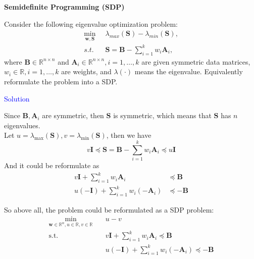 \item[\uppercase\expandafter{\romannumeral3}.]\textbf{Semidefinite Programming (SDP)}

Consider the following eigenvalue optimization problem:
$$
\begin{aligned}
\min_{\mathbf{w}, \mathbf{S}}\;\; &\lambda_{max}(\mathbf{S})-\lambda_{min}(\mathbf{S}),\\
s.t.\;\;& \mathbf{S}=\mathbf{B}-\sum_{i=1}^{k}w_i\mathbf{A}_i,
\end{aligned}
$$
where $\mathbf{B}\in \mathbb R^{n\times n}$ and $\mathbf{A}_i\in \mathbb R^{n\times n}, i=1, \dots, k$ are given symmetric data matrices, $w_i\in\mathbb{R}, i=1, \dots, k$ are weights, and $\lambda(\cdot)$ means the eigenvalue. Equivalently reformulate the problem into a SDP. 

\textcolor{blue}{Solution}

Since $\pmb B, \pmb A_i$ are symmetric, then $\pmb S$ is symmetric, which means that $\pmb S$ has $n$ eigenvalues. \\
Let $u=\lambda_{\max}(\pmb S), v=\lambda_{\min}(\pmb S)$, then we have
$$ v\pmb I \preceq \pmb S =\mathbf{B}-\sum_{i=1}^{k}w_i\mathbf{A}_i \preceq u\pmb I$$
And it could be reformulate as
\begin{align*}
v\pmb I + \sum_{i=1}^k w_i\pmb A_i &\preceq \pmb B \\
u(-\pmb I) + \sum_{i=1}^k w_i (-\pmb A_i) &\preceq -\pmb B
\end{align*}

So above all, the problem could be reformulated as a SDP problem:
\begin{align*}
\min_{\mathbf{w}\in\mathbb{R}^n, u\in\mathbb{R}, v\in\mathbb{R}} &\quad u-v \\
\text{s.t.} &\quad v\pmb I + \sum_{i=1}^k w_i\pmb A_i \preceq \pmb B \\
&\quad u(-\pmb I) + \sum_{i=1}^k w_i (-\pmb A_i) \preceq -\pmb B \\
\end{align*}

\newpage